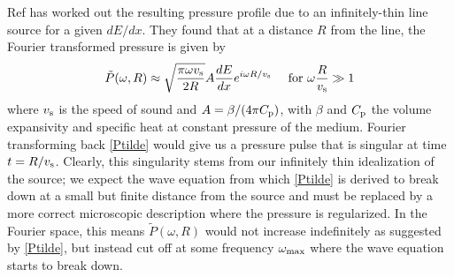 \documentclass[%
 reprint,
 amsmath,amssymb,
 aps,nofootinbib
]{revtex4-1}
\begin{document}
Ref \cite{Learned:1978iv} has worked out the resulting pressure profile due to an infinitely-thin line source for a given $dE/dx$. They found that at a distance $R$ from the line, the Fourier transformed pressure is given by
\begin{equation}
    \tilde{P}(\omega, R)\approx \sqrt{\frac{\pi\omega v_{\rm s}}{2 R}}A\frac{dE}{dx}e^{i\omega R/v_{\rm s}}\quad \text{ for } \omega \frac{R}{v_{\rm s}}\gg 1\label{Ptilde}
\end{equation}
where $v_{\rm s}$ is the speed of sound and $A=\beta/(4\pi C_{\rm p})$, with $\beta$ and $C_{\rm p}$ the volume expansivity and specific heat at constant pressure of the medium. Fourier transforming back \eqref{Ptilde} would give us a pressure pulse that is singular at time $t=R/v_{\rm s}$. Clearly, this singularity stems from our infinitely thin idealization of the source; we expect the wave equation from which \eqref{Ptilde} is derived to break down at a small but finite distance from the source and must be replaced by a more correct microscopic description where the pressure is regularized. In the Fourier space, this means $\tilde{P}(\omega, R)$ would not increase indefinitely as suggested by \eqref{Ptilde}, but instead cut off at some frequency $\omega_{\rm max}$ where the wave equation starts to break down. 
\end{document}
